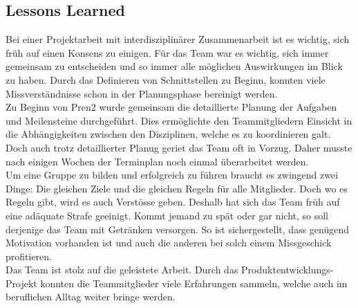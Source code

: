 \subsection{Lessons Learned}
Bei einer Projektarbeit mit interdisziplinärer Zusammenarbeit ist es wichtig, sich früh auf einen Konsens zu einigen.
Für das Team war es wichtig, sich immer gemeinsam zu entscheiden und so immer alle möglichen Auswirkungen im Blick zu haben.
Durch das Definieren von Schnittstellen zu Beginn, konnten viele Missverständnisse schon in der Planungsphase bereinigt werden.
\\[0.2cm]
Zu Beginn von Pren2 wurde gemeinsam die detaillierte Planung der Aufgaben und Meilensteine durchgeführt. Dies ermöglichte den Teammitgliedern Einsicht in die Abhängigkeiten zwischen den Disziplinen, welche es zu koordinieren galt. Doch auch trotz detaillierter Planug geriet das Team oft in Vorzug. Daher musste nach einigen Wochen der Terminplan noch einmal überarbeitet werden.
\\[0.2cm]
Um eine Gruppe zu bilden und erfolgreich zu führen braucht es zwingend zwei Dinge:
Die gleichen Ziele und die gleichen Regeln für alle Mitglieder.
Doch wo es Regeln gibt, wird es auch Verstösse geben. Deshalb hat sich das Team früh auf eine adäquate Strafe geeinigt.
Kommt jemand zu spät oder gar nicht, so soll derjenige das Team mit Getränken versorgen.
So ist sichergestellt, dass genügend Motivation vorhanden ist und auch die anderen bei solch einem Missgeschick profitieren.
\\[0.2]
Das Team ist stolz auf die geleistete Arbeit. Durch das Produktentwicklungs-Projekt konnten die Teammitglieder viele Erfahrungen sammeln, welche auch im beruflichen Alltag weiter bringe werden.